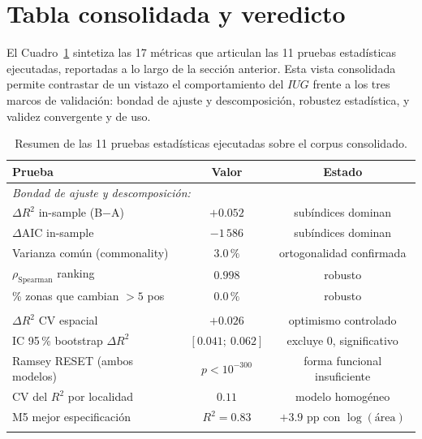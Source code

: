 \documentclass[12pt, a4paper, twoside, openright]{report}
\theoremstyle{plain}
\theoremstyle{definition}
\newcommand{\IUG}{IUG}             %
\begin{document}
\section{Tabla consolidada y veredicto}\label{sec:tabla_validez}

El Cuadro~\ref{tab:consolidada_validez} sintetiza las 17 métricas que articulan las 11 pruebas estadísticas ejecutadas, reportadas a lo largo de la sección anterior. Esta vista consolidada permite contrastar de un vistazo el comportamiento del $\IUG$ frente a los tres marcos de validación: bondad de ajuste y descomposición, robustez estadística, y validez convergente y de uso.

\begin{table}[htbp]
\centering
\caption{Resumen de las 11 pruebas estadísticas ejecutadas sobre el corpus consolidado.}
\label{tab:consolidada_validez}
\small
\begin{tabular}{@{}lcc@{}}
\toprule
\textbf{Prueba} & \textbf{Valor} & \textbf{Estado} \\
\midrule
\multicolumn{3}{l}{\textit{Bondad de ajuste y descomposición:}} \\
$\Delta R^2$ in-sample (B$-$A) & $+0.052$ & subíndices dominan \\
$\Delta$AIC in-sample          & $-1\,586$ & subíndices dominan \\
Varianza común (commonality)   & $3.0\,\%$ & ortogonalidad confirmada \\
$\rho_{\text{Spearman}}$ ranking & $0.998$ & robusto \\
\% zonas que cambian $> 5$ pos & $0.0\,\%$ & robusto \\
\addlinespace
\multicolumn{3}{l}{\textit{Robustez:}} \\
$\Delta R^2$ CV espacial       & $+0.026$ & optimismo controlado \\
IC 95\,\% bootstrap $\Delta R^2$ & $[0.041;\ 0.062]$ & excluye 0, significativo \\
Ramsey RESET (ambos modelos)   & $p < 10^{-300}$ & forma funcional insuficiente \\
CV del $R^2$ por localidad     & $0.11$ & modelo homogéneo \\
M5 mejor especificación        & $R^2 = 0.83$ & $+3.9$ pp con $\log(\text{\'area})$ \\
\addlinespace
\multicolumn{3}{l}{\textit{Validez convergente (lectura tradicional):}} \\

\end{tabular}
\end{table}
\end{document}
